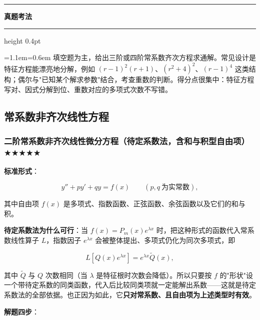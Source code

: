 \documentclass[11pt,openany,UTF8]{ctexbook}
\newcommand{\callouthead}[2]{%
  \par\addvspace{7pt}\noindent
  {\color{#1}\rule[-0.15em]{3pt}{1.05em}}\hspace{0.5em}%
  {\bfseries\color{#1}#2}\par\nobreak\vspace{-0.35em}%
  {\color{rulesep}\hrule height 0.4pt}\nobreak\vspace{0.45em}%
  \begingroup\small\setlength{\parindent}{0pt}%
  \leftskip=1.1em\rightskip=0.6em\noindent\ignorespaces}
\newcommand{\calloutend}{\par\endgroup\addvspace{7pt}}
\newenvironment{callexam}[1]{\callouthead{exambar}{#1}}{\calloutend}
\begin{document}
\begin{callexam}{真题考法}
填空题为主，给出三阶或四阶常系数齐次方程求通解。常见设计是特征方程能漂亮地分解，例如 $(r-1)^{2}(r+1)$、$(r^{2}+4)^{2}$、$(r-1)^{4}$ 这类结构；偶尔与"已知某个解求参数"结合，考查重数的判断。得分点很集中：特征方程写对、因式分解到位、重数对应的多项式次数不写错。

\end{callexam}

\subsection{常系数非齐次线性方程}

\subsubsection{二阶常系数非齐次线性微分方程（待定系数法，含和与积型自由项） $\bigstar$$\bigstar$$\bigstar$$\bigstar$$\bigstar$}

\textbf{标准形式}：

\[y''+py'+qy=f(x)\qquad (p,q\ \text{为实常数}),\]

其中自由项 $f(x)$ 是多项式、指数函数、正弦函数、余弦函数以及它们的和与积。

\textbf{待定系数法为什么可行}：当 $f(x)=P_m(x)e^{\lambda x}$ 时，把这种形式的函数代入常系数线性算子 $L$，指数因子 $e^{\lambda x}$ 会被整体提出、多项式仍化为同次多项式，即

\[L\left[Q(x)e^{\lambda x}\right]=e^{\lambda x}\tilde{Q}(x),\]

其中 $\tilde Q$ 与 $Q$ 次数相同（当 $\lambda$ 是特征根时次数会降低）。所以只要按 $f$ 的"形状"设一个带待定系数的同类函数，代入后比较同类项就一定能解出系数——这就是待定系数法的全部依据。也正因为如此，它\textbf{只对常系数、且自由项为上述类型时有效}。

\textbf{解题四步}：
\end{document}
